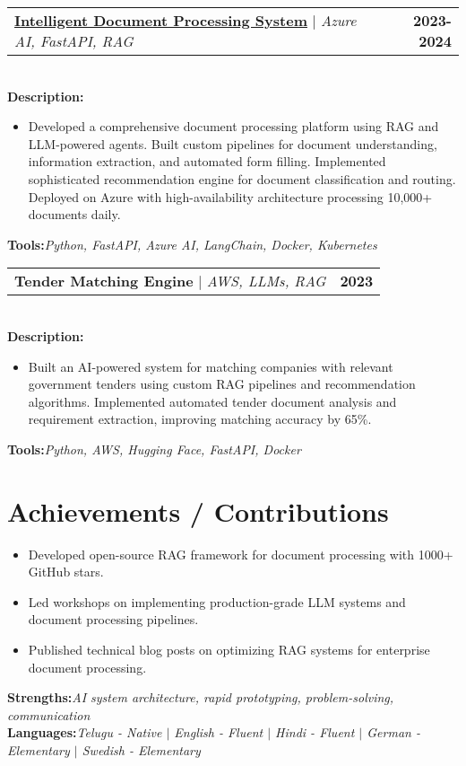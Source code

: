 \documentclass[letterpaper,11pt]{article}
\makeatletter
\newcommand{\resumeItem}[1]{
  \item\small{
    {#1 \vspace{-2pt}}
  }
}
\newcommand{\resumeProjectHeading}[2]{
    \item
    \begin{tabular*}{1.001\textwidth}{l@{\extracolsep{\fill}}r}
      \small#1 & \textbf{\small #2}\\
    \end{tabular*}\vspace{-7pt}
}
\newcommand{\resumeSubHeadingListStart}{\begin{itemize}[leftmargin=0.0in, label={}]}
\newcommand{\resumeSubHeadingListEnd}{\end{itemize}}
\newcommand{\resumeItemListStart}{\begin{itemize}}
\newcommand{\resumeItemListEnd}{\end{itemize}\vspace{-5pt}}
\makeatother
\begin{document}
\resumeProjectHeading
{\textbf{\href{https://ui.cedzlabs.com/resume}{Intelligent Document Processing System}} $|$ \emph{Azure AI, FastAPI, RAG}}{2023-2024}\\
\vspace{6pt}
\textbf{Description:}
\vspace{-5pt}
\resumeItemListStart
\resumeItem{Developed a comprehensive document processing platform using RAG and LLM-powered agents. Built custom pipelines for document understanding, information extraction, and automated form filling. Implemented sophisticated recommendation engine for document classification and routing. Deployed on Azure with high-availability architecture processing 10,000+ documents daily.}
\resumeItemListEnd
\vspace{4pt}
\textbf{Tools:}\emph{Python, FastAPI, Azure AI, LangChain, Docker, Kubernetes}
\vspace{-10pt}

\resumeProjectHeading
{\textbf{Tender Matching Engine} $|$ \emph{AWS, LLMs, RAG}}{2023}\\
\vspace{6pt}
\textbf{Description:}
\vspace{-5pt}
\resumeItemListStart
\resumeItem{Built an AI-powered system for matching companies with relevant government tenders using custom RAG pipelines and recommendation algorithms. Implemented automated tender document analysis and requirement extraction, improving matching accuracy by 65\%.}
\resumeItemListEnd
\vspace{4pt}
\textbf{Tools:}\emph{Python, AWS, Hugging Face, FastAPI, Docker}
\vspace{-12pt}

\section{Achievements / Contributions}
\resumeSubHeadingListStart
\resumeItemListStart
\resumeItem{Developed open-source RAG framework for document processing with 1000+ GitHub stars.}
\resumeItem{Led workshops on implementing production-grade LLM systems and document processing pipelines.}
\resumeItem{Published technical blog posts on optimizing RAG systems for enterprise document processing.}
\resumeItemListEnd

\resumeSubHeadingListEnd
\textbf{Strengths:}\emph{AI system architecture, rapid prototyping, problem-solving, communication} \\
\textbf{Languages:}\emph{Telugu - Native $|$ English - Fluent $|$ Hindi - Fluent $|$ German - Elementary $|$ Swedish - Elementary}

\vspace{10pt}
\end{document}

